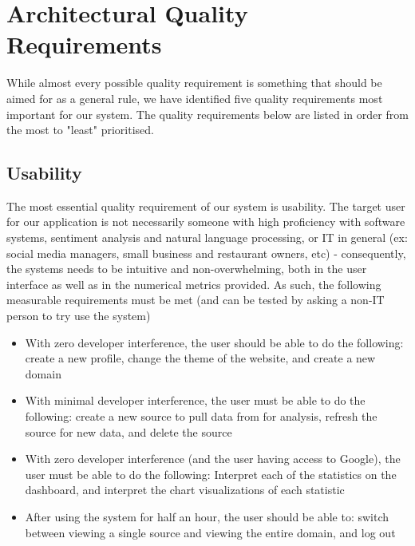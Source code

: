 \documentclass[12pt]{article}
\begin{document}
\newpage
\section{Architectural Quality Requirements}
While almost every possible quality requirement is something that should be aimed for as a general rule, we have identified five quality requirements most important for our system. The quality requirements below are listed in order from the most to "least" prioritised.
\subsection{Usability}
The most essential quality requirement of our system is usability. The target user for our application is not necessarily someone with high proficiency with software systems, sentiment analysis and natural language processing, or IT in general (ex: social media managers, small business and restaurant owners, etc) - consequently, the systems needs to be intuitive and non-overwhelming, both in the user interface as well as in the numerical metrics provided. As such, the following measurable requirements must be met (and can be tested by asking a non-IT person to try use the system)
\begin{itemize}
    \item With zero developer interference, the user should be able to do the following: create a new profile, change the theme of the website, and create a new domain
    \item With minimal developer interference, the user must be able to do the following: create a new source to pull data from for analysis, refresh the source for new data, and delete the source
    \item With zero developer interference (and the user having access to Google), the user must be able to do the following: Interpret each of the statistics on the dashboard, and interpret the chart visualizations of each statistic
    \item After using the system for half an hour, the user should be able to: switch between viewing a single source and viewing the entire domain, and log out
\end{itemize}
\end{document}
